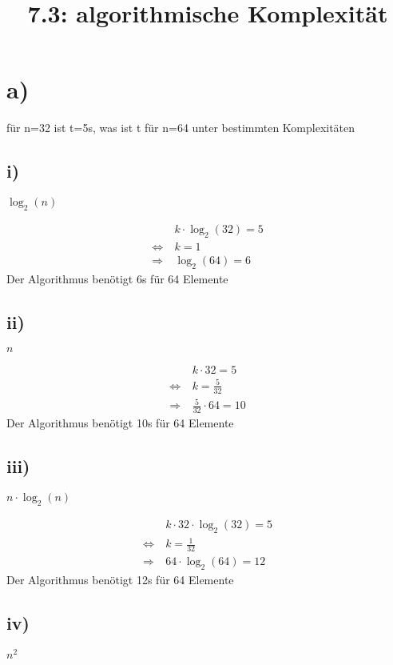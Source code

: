 \documentclass[12pt, a4paper, reqno]{amsart}
\begin{document}
    \title{7.3: algorithmische Komplexität}
    \maketitle
    
    \section*{a)}
    für n=32 ist t=5s, was ist t für n=64 unter bestimmten Komplexitäten
    
    \subsection*{i)} $\log_2(n)$
    
    \begin{align}
        &k\cdot \log_2(32) = 5\\
        \Leftrightarrow\  & k = 1 \\
        \Rightarrow\  & \log_2(64) = 6
    \end{align}
    Der Algorithmus benötigt 6s für 64 Elemente
    
    \subsection*{ii)} $n$
    
    \begin{align}
    &k\cdot 32 = 5\\
    \Leftrightarrow\  & k = \frac 5 {32} \\
    \Rightarrow\  & \frac 5 {32}\cdot 64 = 10
    \end{align}
    Der Algorithmus benötigt 10s für 64 Elemente
    
    
    \subsection*{iii)} $n\cdot \log_2(n)$
    
    \begin{align}
    &k\cdot 32 \cdot \log_2(32) = 5\\
    \Leftrightarrow\  & k = \frac 1 {32} \\
    \Rightarrow\  & 64\cdot \log_2(64) = 12
    \end{align}
    Der Algorithmus benötigt 12s für 64 Elemente
    
    
    \subsection*{iv)} $n^2$
    
\end{document}
